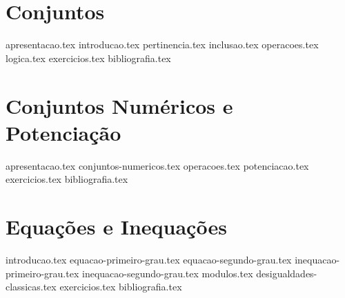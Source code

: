 \documentclass[a4paper,12pt, oneside]{book}
\begin{document}
    \nocite{*}
    \thispagestyle{empty}       %

    \printtitle                 %
        \vfill
    \printauthor                %
    \newpage
    
    \frontmatter %
    \tableofcontents
    \mainmatter %

    \chapter{Conjuntos}
    {apresentacao.tex}
    {introducao.tex}
    {pertinencia.tex}
    {inclusao.tex}
    {operacoes.tex}
    {logica.tex}
    {exercicios.tex}
    {bibliografia.tex} %


    \chapter{Conjuntos Numéricos e Potenciação}
    \label{cap:conjuntos-numericos}    
    {apresentacao.tex}
    {conjuntos-numericos.tex}
    {operacoes.tex}
    {potenciacao.tex}
    {exercicios.tex}
    {bibliografia.tex} %

    \chapter{Equações e Inequações}
    {introducao.tex}
    {equacao-primeiro-grau.tex}
    {equacao-segundo-grau.tex}
    {inequacao-primeiro-grau.tex}
    {inequacao-segundo-grau.tex}
    {modulos.tex}
    {desigualdades-classicas.tex}
    {exercicios.tex}
    {bibliografia.tex} %
\end{document}

